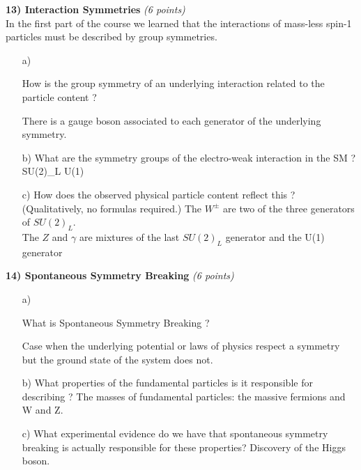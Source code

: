 {\textbf{13) Interaction Symmetries } \hfill \textit{(6 points)} \\ 
In the first part of the course we learned that the interactions of mass-less spin-1 particles must be described by group symmetries. 
\begin{itemize}
\item[a)]{How is the group symmetry of an underlying interaction related to the particle content ?

\bc
There is a gauge boson associated to each generator of the underlying symmetry.
\ec

}
\item[b)]{What are the symmetry groups of the electro-weak interaction in the SM ? 
\be
  SU(2)_L \times U(1)
\ee
}
\item[c)]{How does the observed physical particle content reflect this ? (Qualitatively, no formulas required.) 
\bc
The $W^\pm$ are two of the three generators of $SU(2)_L$.\\
The $Z$ and $\gamma$ are mixtures of the last $SU(2)_L$ generator and the U(1) generator
\ec
}

\end{itemize}

\vspace*{0.5in}

\textbf{14) Spontaneous Symmetry Breaking} \hfill \textit{(6 points)} \\ 
\begin{itemize}
\item[a)]{What is Spontaneous Symmetry Breaking  ? 

\bc
Case when the underlying potential or laws of physics respect a symmetry but the ground state of the system does not.
\ec

 }
\item[b)]{What properties of the fundamental particles is it responsible for describing ?
\bc
The masses of fundamental particles: the massive fermions and W and Z.
\ec
}
\item[c)]{What experimental evidence do we have that spontaneous symmetry breaking is actually responsible for these properties?
\bc
Discovery of the Higgs boson.
\ec
}
\end{itemize}



} %

